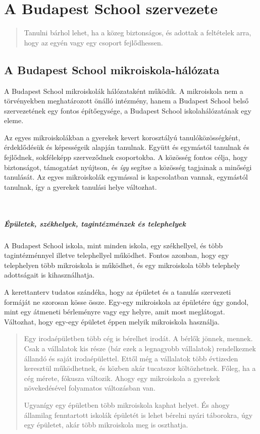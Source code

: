 
\chapter{A Budapest School szervezete}
\begin{quote}
Tanulni bárhol lehet, ha a közeg biztonságos, és adottak a feltételek arra, hogy az egyén vagy egy csoport fejlődhessen.
\end{quote}

\section{A Budapest School mikroiskola-hálózata}

 A Budapest School mikroiskolák hálózataként működik. A mikroiskola nem a
 törvényekben meghatározott önálló intézmény, hanem a Budapest School belső
 szervezetének egy fontos építőegysége, a Budapest School iskolahálózatának egy
 eleme.

Az egyes mikroiskolákban a gyerekek kevert korosztályú tanulóközösségként,
érdeklődésük és képességeik alapján tanulnak. Együtt és egymástól tanulnak és fejlődnek,
sokféleképp szerveződnek csoportokba. A közösség
fontos célja, hogy biztonságot, támogatást nyújtson, és \emph{így} segítse a közösség tagjainak a
minőségi tanulását. Az egyes mikroiskolák egymással is kapcsolatban vannak,
egymástól tanulnak, így a gyerekek tanulási helye változhat.

 \paragraph{Épületek, székhelyek, tagintézménzek és telephelyek}
A Budapest School iskola, mint minden iskola, egy székhellyel, és több tagintézménnyel illetve telephellyel működhet. Fontos azonban, hogy egy telephelyen több mikroiskola is működhet, és egy mikroiskola több telephely adottságait is kihasználhatja.

A kerettanterv tudatos szándéka, hogy az épületet és a
tanulás szervezeti formáját ne szorosan kösse össze. Egy-egy mikroiskola az
épületére úgy gondol, mint egy átmeneti bérleményre vagy egy helyre, amit most meglátogat.
Változhat, hogy egy-egy épületet éppen melyik mikroiskola használja.


 \begin{quote}
Egy irodaépületben több cég is bérelhet irodát. A bérlők jönnek, mennek. Csak a vállalatok kis része (bár ezek a legnagyobb vállalatok) rendelkeznek állandó és saját irodaépülettel. Ettől még a vállalatok több évtizeden keresztül működhetnek, és közben akár tucatszor költözhetnek. Főleg, ha a cég mérete, fókusza változik. Ahogy egy mikroiskola a gyerekek növekedésével folyamatos változásban van.

Ugyanígy egy épületben több mikroiskola kaphat helyet. És ahogy államilag fenntartott iskolák épületét is lehet bérelni nyári táborokra, úgy egy épületet, akár több mikroiskola meg is oszthatja.
\end{quote}

